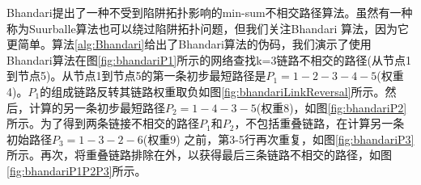 Bhandari\cite{bhandari1997optimal}提出了一种不受到陷阱拓扑影响的min-sum不相交路径算法。虽然有一种称为Suurballe算法\cite{suurballe1974disjoint}也可以绕过陷阱拓扑问题，但我们关注Bhandari 算法，因为它更简单。算法\ref{alg:Bhandari}给出了Bhandari算法的伪码，我们演示了使用Bhandari算法在图\ref{fig:bhandariP1}所示的网络查找k=3链路不相交的路径(从节点1到节点5)。从节点1到节点5的第一条初步最短路径是$P_1=1-2-3-4-5$(权重4)。$P_1$的组成链路反转其链路权重取负如图\ref{fig:bhandariLinkReversal}所示。然后，计算的另一条初步最短路径$P_2=1-4-3-5$(权重8)，如图\ref{fig:bhandariP2}所示。为了得到两条链接不相交的路径$P_1$和$P_2$，不包括重叠链路，在计算另一条初始路径$P_3=1-3-2-6$(权重9) 之前，第3-5行再次重复，如图\ref{fig:bhandariP3}所示。再次，将重叠链路排除在外，以获得最后三条链路不相交的路径，如图\ref{fig:bhandariP1P2P3}所示。

\begin{figure}[htbp]
  \centering

\end{figure}
